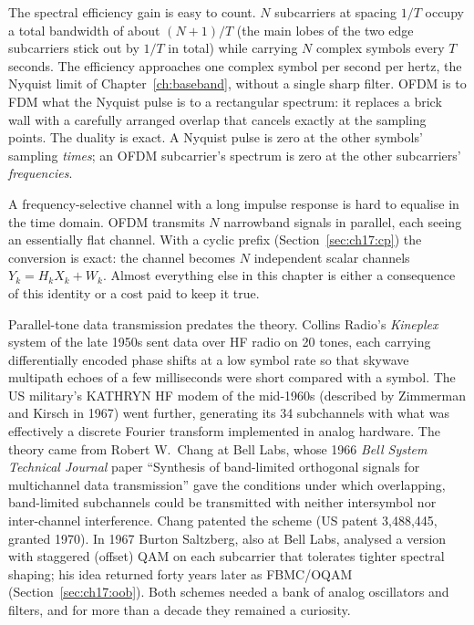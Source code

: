 The spectral efficiency gain is easy to count. $N$ subcarriers at spacing $1/T$ occupy a total
bandwidth of about $(N+1)/T$ (the main lobes of the two edge subcarriers stick out by $1/T$ in
total) while carrying $N$ complex symbols every $T$ seconds. The efficiency approaches one complex
symbol per second per hertz, the Nyquist limit of Chapter~\ref{ch:baseband}, without a single
sharp filter. OFDM is to FDM what the Nyquist pulse is to a rectangular spectrum: it replaces a
brick wall with a carefully arranged overlap that cancels exactly at the sampling points. The
duality is exact. A Nyquist pulse is zero at the other symbols' sampling \emph{times}; an OFDM
subcarrier's spectrum is zero at the other subcarriers' \emph{frequencies}.

\begin{keyidea}
A frequency-selective channel with a long impulse response is hard to equalise in the time domain.
OFDM transmits $N$ narrowband signals in parallel, each seeing an essentially flat channel. With a
cyclic prefix (Section~\ref{sec:ch17:cp}) the conversion is exact: the channel becomes $N$
independent scalar channels $Y_k=H_kX_k+W_k$. Almost everything else in this chapter is either a
consequence of this identity or a cost paid to keep it true.
\end{keyidea}


\begin{history}
Parallel-tone data transmission predates the theory. Collins Radio's \emph{Kineplex} system of the
late 1950s sent data over HF radio on 20 tones, each carrying differentially encoded phase
shifts at a low symbol rate so that skywave multipath echoes of a few milliseconds were short
compared with a symbol. The US military's KATHRYN HF modem of the mid-1960s (described by
Zimmerman and Kirsch in 1967) went further, generating its 34 subchannels with what was
effectively a discrete Fourier transform implemented in analog hardware. The theory came from
Robert W.~Chang at Bell Labs, whose 1966 \emph{Bell System Technical Journal} paper ``Synthesis of
band-limited orthogonal signals for multichannel data transmission'' gave the conditions under
which overlapping, band-limited subchannels could be transmitted with neither intersymbol nor
inter-channel interference. Chang patented the scheme (US patent 3,488,445, granted 1970). In
1967 Burton Saltzberg, also at Bell Labs, analysed a version with staggered (offset) QAM on each
subcarrier that tolerates tighter spectral shaping; his idea returned forty years later as
FBMC/OQAM (Section~\ref{sec:ch17:oob}). Both schemes needed a bank of analog oscillators and
filters, and for more than a decade they remained a curiosity.
\end{history}

